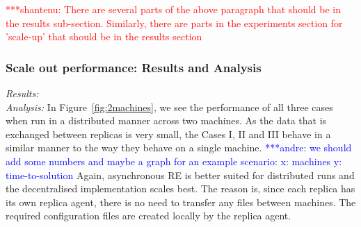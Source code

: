 \documentclass{rspublic}
\newcommand{\jhanote}[1]{ {\textcolor{red} { ***shantenu: #1 }}}
\newcommand{\alnote}[1]{ {\textcolor{blue} { ***andre: #1 }}}
\newcommand{\alnote}[1]{}
\newcommand{\jhanote}[1]{}
\begin{document}
\jhanote{There are several parts of the above paragraph that should be
  in the results sub-section. Similarly, there are parts in the
  experiments section for 'scale-up' that should be in the results
  section}

\subsubsection{Scale out performance: Results and Analysis}

{\it Results:}\\


{\it Analysis: } In Figure~\ref{fig:2machines}, we see the performance of all three cases when run in a distributed manner across two machines. As the data that is exchanged between replicas is very small, the Cases I, II and III behave in a similar manner to the way they behave on a single machine. \alnote{we should add some numbers and maybe a graph for an example scenario: x: machines y: time-to-solution} Again, asynchronous RE is better suited for distributed runs and the decentralised implementation scales best. The reason is, since each replica has its own replica agent, there is no need to transfer any files between machines. The required configuration files are created locally by the replica agent.
\end{document}
